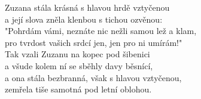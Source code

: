 \begin{large}
Zuzana stála krásná s hlavou hrdě vztyčenou\\
a její slova zněla klenbou s tichou ozvěnou:\\
"Pohrdám vámi, neznáte nic nežli samou lež a klam,\\
pro tvrdost vašich srdcí jen, jen pro ni umírám!"\\
   
Tak vzali Zuzanu na kopec pod šibenici\\
a všude kolem ní se sběhly davy běsnící,\\
a ona stála bezbranná, však s hlavou vztyčenou,\\
zemřela tiše samotná pod letní oblohou.

\end{large}

\newpage
